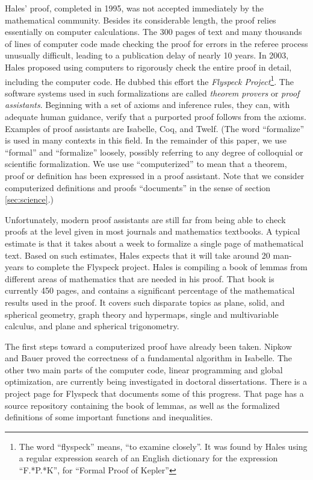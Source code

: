 Hales' proof, completed in 1995, was not accepted immediately by the
mathematical community.  Besides its considerable length, the proof relies
essentially on computer calculations.  The 300 pages of text and many thousands
of lines of computer code made checking the proof for errors in the referee
process unusually difficult, leading to a publication delay of nearly 10 years.
In 2003, Hales proposed using computers to rigorously check the entire proof in
detail, including the computer code.  He dubbed this effort the \textit{Flyspeck
  Project}\footnote{The word ``flyspeck'' means, ``to examine closely''.  It was
  found by Hales using a regular expression search of an English dictionary for
  the expression ``F.*P.*K'', for ``Formal Proof of Kepler''}.  The software
systems used in such formalizations are called \textit{theorem provers} or
\textit{proof assistants}.  Beginning with a set of axioms and inference rules,
they can, with adequate human guidance, verify that a purported proof follows
from the axioms.  Examples of proof assistants are
Isabelle\cite{Paulson:1994:Isabelle}, Coq\cite{Bertot:2004:CoqBook}, and
Twelf\cite{Schurmann:1999:Twelf}. (The word ``formalize'' is used in many
contexts in this field.  In the remainder of this paper, we use ``formal'' and
``formalize'' loosely, possibly referring to any degree of colloquial or
scientific formalization.  We use use ``computerized'' to mean that a theorem,
proof or definition has been expressed in a proof assistant.  Note that we
consider computerized definitions and proofs ``documents'' in the sense of
section \ref{sec:science}.)

  Unfortunately, modern proof assistants are still far from being able to check
proofs at the level given in most journals and mathematics textbooks.  A typical
estimate is that it takes about a week to formalize a single page of mathematical
text.  Based on such estimates, Hales expects that it will take 
around 20 man-years to complete the Flyspeck project.  
Hales is compiling a book\cite{Hales:2007:FlyspeckBook}
of lemmas from different areas of mathematics that are needed in his proof. 
That book is currently 450 pages, and contains a significant percentage
of the mathematical results used in the proof.  It covers such disparate topics
as plane, solid, and spherical geometry, graph theory and hypermaps, single and
multivariable calculus, and plane and spherical trigonometry.

The first steps toward a computerized proof have already been taken.
Nipkow and Bauer\cite{Nipkow:2005:Tame} proved the correctness of a
fundamental algorithm in Isabelle.  The other two main parts of the
computer code, linear programming and global optimization, are
currently being investigated in doctoral
dissertations\cite{Zumkeller:2006:TaylorModels,Obua:2005:LinearPrograms}.
There is a project page\cite{website:FlyspeckProjectPage} for Flyspeck
that documents some of this progress.  That page has a source
repository containing the book of lemmas, as well as the formalized
definitions of some important functions and inequalities.  

